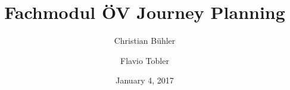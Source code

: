 \title{Fachmodul ÖV Journey Planning}
\date{January 4, 2017}
\author{ Christian Bühler \and Flavio Tobler}

\maketitle